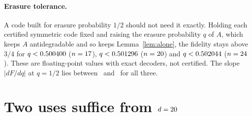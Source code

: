 \documentclass[aps,pra,twocolumn,superscriptaddress,nofootinbib,longbibliography,floatfix]{revtex4-2}
\begin{document}
\paragraph*{Erasure tolerance.} A code built for erasure probability $1/2$ should not need it exactly. Holding each certified symmetric code fixed and raising the erasure probability $q$ of $A$, which keeps $A$ antidegradable and so keeps Lemma~\ref{lem:alone}, the fidelity stays above $3/4$ for $q<0.500400$ ($n=17$), $q<0.501296$ ($n=20$) and $q<0.502044$ ($n=24$). These are floating-point values with exact decoders, not certified. The slope $|dF/dq|$ at $q=1/2$ lies between \ErasSlopeLo\ and \ErasSlopeHi\ for all three.

\section{Two uses suffice from $d=20$}
\label{sec:twouse}
\end{document}

